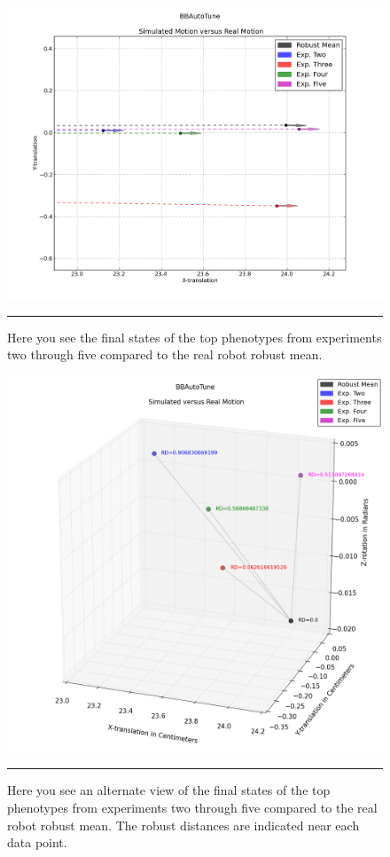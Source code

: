 \begin{figure}[htbp]
\centering
\includegraphics[width=6in]{../Figures/Chapter4/simu_vs_real_line.png}
\rule{35em}{0.5pt}
\caption[Simulated versus Real Motion Line Plot]{Here you see the final states of the top phenotypes from experiments two through five compared to the real robot robust mean.}
\label{fig:simu_vs_real_line}
\end{figure}

\begin{figure}[htbp]
\centering
\includegraphics[width=5in]{../Figures/Chapter4/simu_vs_real_3d.png}
\rule{35em}{0.5pt}
\caption[Simulated versus Real Motion 3D Plot]{Here you see an alternate view of the final states of the top phenotypes from experiments two through five compared to the real robot robust mean. The robust distances are indicated near each data point.}
\label{fig:simu_vs_real_3d}
\end{figure}

